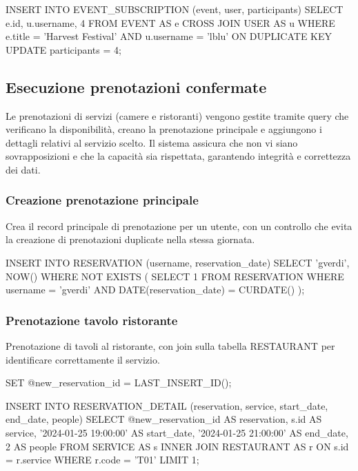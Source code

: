 \documentclass[a4paper,12pt]{report}
\begin{document}
\begin{sqlcode}[caption={}]
INSERT INTO EVENT_SUBSCRIPTION (event, user, participants)
SELECT
  e.id,
  u.username,
  4
FROM EVENT AS e
CROSS JOIN USER AS u
WHERE e.title = 'Harvest Festival' AND u.username = 'lblu'
ON DUPLICATE KEY UPDATE participants = 4;
\end{sqlcode}

\newpage
\subsection{Esecuzione prenotazioni confermate}
Le prenotazioni di servizi (camere e ristoranti) vengono gestite
tramite query che verificano la disponibilità, creano la prenotazione
principale e aggiungono i dettagli relativi al servizio scelto. Il
sistema assicura che non vi siano sovrapposizioni e che la capacità
sia rispettata, garantendo integrità e correttezza dei dati.

\subsubsection{Creazione prenotazione principale}
Crea il record principale di prenotazione per un utente, con un
controllo che evita la creazione di prenotazioni duplicate nella
stessa giornata.

\begin{sqlcode}[caption={}]
INSERT INTO RESERVATION (username, reservation_date)
SELECT
  'gverdi',
  NOW()
WHERE NOT EXISTS (
  SELECT 1
  FROM RESERVATION
  WHERE
    username = 'gverdi'
    AND DATE(reservation_date) = CURDATE()
  );
\end{sqlcode}

\subsubsection{Prenotazione tavolo ristorante}
Prenotazione di tavoli al ristorante, con join sulla tabella
RESTAURANT per identificare correttamente il servizio.
\begin{sqlcode}[caption={}]
SET @new_reservation_id = LAST_INSERT_ID();

INSERT INTO RESERVATION_DETAIL (reservation, service, start_date, end_date, people)
SELECT
  @new_reservation_id AS reservation,
  s.id AS service,
  '2024-01-25 19:00:00' AS start_date,
  '2024-01-25 21:00:00' AS end_date,
  2 AS people
FROM SERVICE AS s
INNER JOIN RESTAURANT AS r ON s.id = r.service
WHERE r.code = 'T01'
LIMIT 1;
\end{sqlcode}
\end{document}
